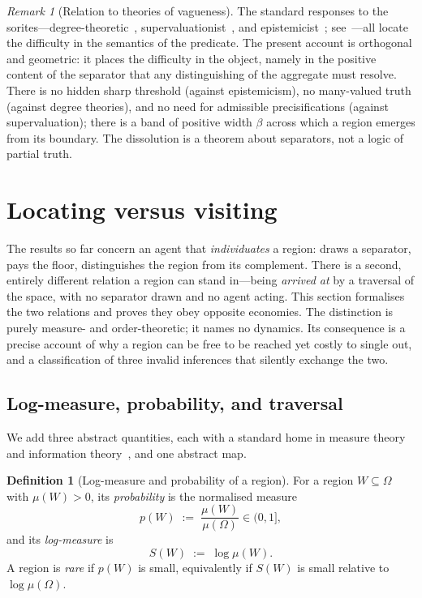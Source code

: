 \documentclass[11pt,a4paper]{article}
\theoremstyle{thmstyle}
\theoremstyle{definition}
\newtheorem{definition}[theorem]{Definition}
\theoremstyle{remark}
\newtheorem{remark}[theorem]{Remark}
\newcommand{\Space}{\Omega}
\newcommand{\thick}{\beta}
\begin{document}
\begin{remark}[Relation to theories of vagueness]
\label{rem:vagueness}
The standard responses to the sorites---degree-theoretic~\citep{zadeh1965},
supervaluationist~\citep{fine1975,keefe2000}, and
epistemicist~\citep{williamson1994}; see~\citet{black1937,hyderaffman2018}---all
locate the difficulty in the semantics of the predicate. The present account is
orthogonal and geometric: it places the difficulty in the object, namely in the
positive content of the separator that any distinguishing of the aggregate must
resolve. There is no hidden sharp threshold (against epistemicism), no
many-valued truth (against degree theories), and no need for admissible
precisifications (against supervaluation); there is a band of positive width
$\thick$ across which a region emerges from its boundary. The dissolution is a
theorem about separators, not a logic of partial truth.
\end{remark}


\section{Locating versus visiting}
\label{sec:locating}

The results so far concern an agent that \emph{individuates} a region: draws a
separator, pays the floor, distinguishes the region from its complement. There is
a second, entirely different relation a region can stand in---being \emph{arrived
at} by a traversal of the space, with no separator drawn and no agent acting. This
section formalises the two relations and proves they obey opposite economies. The
distinction is purely measure- and order-theoretic; it names no dynamics. Its
consequence is a precise account of why a region can be free to be reached yet
costly to single out, and a classification of three invalid inferences that
silently exchange the two.

\subsection{Log-measure, probability, and traversal}

We add three abstract quantities, each with a standard home in measure theory and
information theory~\citep{shannon1948,cover2006}, and one abstract map.

\begin{definition}[Log-measure and probability of a region]
\label{def:logmeasure}
For a region $W\subseteq\Space$ with $\mu(W)>0$, its \emph{probability} is the
normalised measure
\[
p(W)\;:=\;\frac{\mu(W)}{\mu(\Space)}\in(0,1],
\]
and its \emph{log-measure} is
\[
S(W)\;:=\;\log\mu(W).
\]
A region is \emph{rare} if $p(W)$ is small, equivalently if $S(W)$ is small
relative to $\log\mu(\Space)$.
\end{definition}
\end{document}
